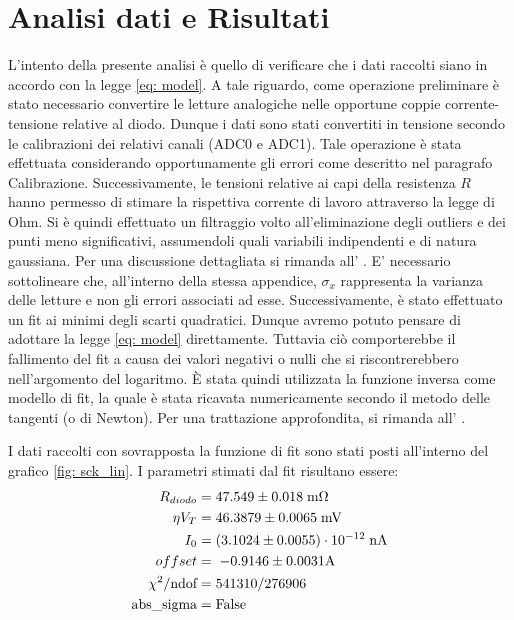 \documentclass{article}[a4paper, oneside, 11pt]
\begin{document}
\section{Analisi dati e Risultati}
L’intento della presente analisi è quello di verificare che i dati raccolti siano in accordo con la legge \eqref{eq: model}. A tale riguardo, come operazione preliminare è stato necessario convertire le letture analogiche nelle opportune coppie corrente-tensione relative al diodo. Dunque i dati sono stati convertiti in tensione secondo le calibrazioni dei relativi canali (ADC0 e ADC1). Tale operazione è stata effettuata considerando opportunamente gli errori come descritto nel paragrafo Calibrazione. Successivamente, le tensioni relative ai capi della resistenza $R$ hanno permesso di stimare la rispettiva corrente di lavoro attraverso la legge di Ohm. 
Si è quindi effettuato un filtraggio volto all'eliminazione degli outliers e dei punti meno significativi, assumendoli quali variabili indipendenti e di natura gaussiana. Per una discussione dettagliata si rimanda all' . E’ necessario sottolineare che, all’interno della stessa appendice, $\sigma_x$ rappresenta la varianza delle letture e non gli errori associati ad esse.
Successivamente, è stato effettuato un fit ai minimi degli scarti quadratici. Dunque avremo potuto pensare di adottare la legge \eqref{eq: model} direttamente. Tuttavia ciò comporterebbe il fallimento del fit a causa dei valori negativi o nulli che si riscontrerebbero nell’argomento del logaritmo. \`E stata quindi utilizzata la funzione inversa come modello di fit, la quale è stata ricavata numericamente secondo il metodo delle tangenti (o di Newton). Per una trattazione approfondita, si rimanda all' .


I dati raccolti con sovrapposta la funzione di fit sono stati posti all'interno del grafico \ref{fig: sck_lin}.
I parametri stimati dal fit risultano essere:
\begin{align*}
	R_{diodo} &= 47.549 \pm 0.018 \; \rm m\Omega \\
	\eta V_T &= 46.3879 \pm 0.0065 \; \rm mV \\
	I_0 &= (3.1024 \pm 0.0055) \cdot 10^{-12} \; \rm nA \\
	offset &=\; - 0.9146\pm 0.0031\rm A\\
	\chi^2/\text{ndof} &= 541310/276906 \\
	\text{abs\_sigma} &= \rm False
\end{align*}
\end{document}

